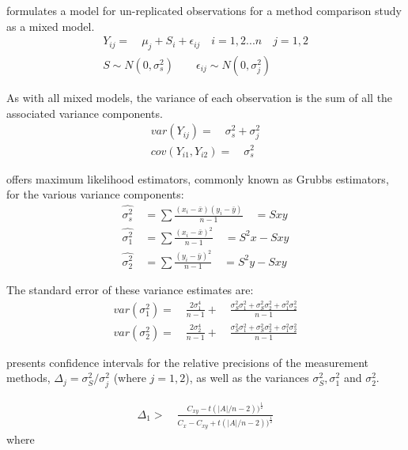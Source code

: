 \documentclass[12pt, a4paper]{report}
\theoremstyle{plain}
\theoremstyle{definition}
\theoremstyle{remark}
\begin{document}
		\citet{Kinsella} formulates a model for un-replicated observations
		for a method comparison study as a mixed model.
		\begin{eqnarray}
		Y_{ij} =\quad \mu_{j} + S_{i} + \epsilon_{ij} \quad i=1,2...n\quad
		j=1,2\\
		S \sim N(0,\sigma^{2}_{s})\qquad \epsilon_{ij} \sim
		N(0,\sigma^{2}_{j}) \nonumber
		\end{eqnarray}
		
		As with all mixed models, the variance of each observation is the
		sum of all the associated variance components.
		\begin{eqnarray}
		var(Y_{ij}) =\quad \sigma^{2}_{s} + \sigma^{2}_{j} \\
		cov(Y_{i1},Y_{i2})=\quad \sigma^{2}_{s} \nonumber
		\end{eqnarray}
		
		\citet{Grubbs48} offers maximum likelihood estimators, commonly
		known as Grubbs estimators, for the various variance components:
		\begin{eqnarray}
		\hat{\sigma^{2}_{s}} \quad= \sum{\frac{(x_{i}-\bar{x})(y_{i}-\bar{y})}{n-1}}\quad=Sxy\\
		\hat{\sigma^{2}_{1}} \quad= \sum{\frac{(x_{i}-\bar{x})^{2}}{n-1}} \quad=S^{2}x-Sxy \nonumber\\
		\hat{\sigma^{2}_{2}} \quad=
		\sum{\frac{(y_{i}-\bar{y})^{2}}{n-1}}\quad=S^{2}y-Sxy \nonumber
		\nonumber
		\end{eqnarray}
		
		The standard error of these variance estimates are:
		\begin{eqnarray}
		var(\sigma^{2}_{1}) =\quad \frac{2\sigma^{4}_{1}}{n-1} +\quad
		\frac{\sigma^2_{S}\sigma^2_{1}+\sigma^2_{S}\sigma^2_{2}+\sigma^2_{1}\sigma^2_{2}
		}{n-1}\\
		var(\sigma^{2}_{2}) =\quad \frac{2\sigma^{4}_{2}}{n-1} +\quad
		\frac{\sigma^2_{S}\sigma^2_{1}+\sigma^2_{S}\sigma^2_{2}+\sigma^2_{1}\sigma^2_{2}
		}{n-1}\nonumber
		\end{eqnarray}
		
		\citet{Thompson}presents confidence intervals for the relative
		precisions of the measurement methods, $\Delta_{j}=
		\sigma^2_{S}/\sigma^2_{j}$ (where $j=1,2$), as well as the
		variances $\sigma^{2}_{S}, \sigma^{2}_{1}$ and $\sigma^{2}_{2}$.
		
		\begin{eqnarray}
		\Delta_{1} >\quad \frac{C_{xy}-
			t(|A|/n-2))^{\frac{1}{2}}}{C_{x}-C_{xy}+
			t(|A|/n-2))^{\frac{1}{2}}}
		\end{eqnarray}
		where
		
\end{document}

